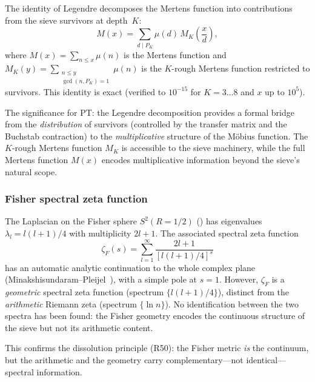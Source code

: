 \documentclass[12pt,a4paper]{article}
\begin{document}
The identity of Legendre decomposes the Mertens function into
contributions from the sieve survivors at depth~$K$:
\begin{equation}
  M(x) = \sum_{d \mid P_K} \mu(d)\,M_K\!\left(\frac{x}{d}\right),
  \label{eq:legendre_bridge}
\end{equation}
where $M(x) = \sum_{n \leq x} \mu(n)$ is the Mertens function and
$M_K(y) = \sum_{\substack{n \leq y \\ \gcd(n, P_K) = 1}} \mu(n)$
is the $K$-rough Mertens function restricted to survivors.
This identity is exact (verified to $10^{-15}$
for $K = 3\ldots 8$ and $x$ up to $10^5$).

The significance for PT: the Legendre decomposition provides a
formal bridge from the \emph{distribution} of survivors (controlled
by the transfer matrix and the Buchstab contraction) to the
\emph{multiplicative} structure of the M\"obius function.  The
$K$-rough Mertens function $M_K$ is accessible to the sieve
machinery, while the full Mertens function $M(x)$ encodes
multiplicative information beyond the sieve's natural scope.

\subsubsection{Fisher spectral zeta function}
\label{subsec:ch7_fisher_zeta}

The Laplacian on the Fisher sphere $S^2(R = 1/2)$ (\cite{companion_M2}) has
eigenvalues $\lambda_l = l(l+1)/4$ with multiplicity $2l+1$.  The
associated spectral zeta function
\begin{equation}
  \zeta_F(s) = \sum_{l=1}^\infty \frac{2l+1}{[l(l+1)/4]^s}
  \label{eq:zeta_fisher}
\end{equation}
has an automatic analytic continuation to the whole complex plane
(Minakshisundaram--Pleijel~\cite{MinPleijel1949}), with a simple
pole at $s = 1$.  However, $\zeta_F$ is a \emph{geometric} spectral
zeta function (spectrum $\{l(l+1)/4\}$), distinct from the
\emph{arithmetic} Riemann zeta (spectrum $\{\ln n\}$).  No
identification between the two spectra has been found: the Fisher
geometry encodes the continuous structure of the sieve but not
its arithmetic content.

This confirms the dissolution principle (R50): the Fisher metric
\emph{is} the continuum, but the arithmetic and the geometry carry
complementary---not identical---spectral information.

\end{document}
